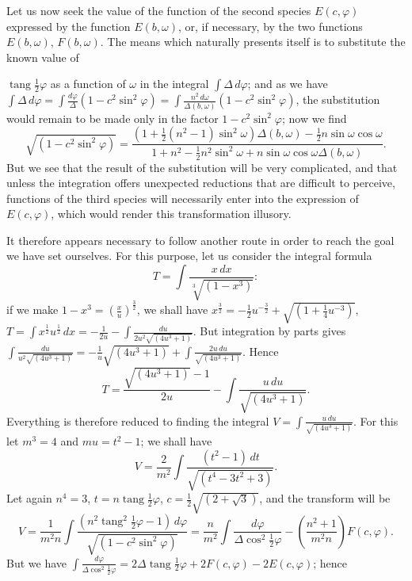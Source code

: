 \documentclass{article}
\begin{document}
Let us now seek the value of the function of the second species $E(c,\varphi)$ expressed by the function $E(b,\omega)$, or, if necessary, by the two functions $E(b,\omega)$, $F(b,\omega)$. The means which naturally presents itself is to substitute the known value of

$\operatorname{tang}\frac{1}{2}\varphi$ as a function of $\omega$ in the integral $\displaystyle\int\Delta\,d\varphi$; and as we have $\displaystyle\int\Delta\,d\varphi=\displaystyle\int\frac{d\varphi}{\Delta}(1-c^{2}\sin^{2}\varphi)=\displaystyle\int\frac{n^{2}\,d\omega}{\Delta(b,\omega)}(1-c^{2}\sin^{2}\varphi)$, the substitution would remain to be made only in the factor $1-c^{2}\sin^{2}\varphi$; now we find
\[ \sqrt{(1-c^{2}\sin^{2}\varphi)}=\frac{(1+\tfrac{1}{2}(n^{2}-1)\sin^{2}\omega)\Delta(b,\omega)-\tfrac{1}{2}n\sin\omega\cos\omega}{1+n^{2}-\tfrac{1}{2}n^{2}\sin^{2}\omega+n\sin\omega\cos\omega\Delta(b,\omega)}. \]
But we see that the result of the substitution will be very complicated, and that unless the integration offers unexpected reductions that are difficult to perceive, functions of the third species will necessarily enter into the expression of $E(c,\varphi)$, which would render this transformation illusory.

It therefore appears necessary to follow another route in order to reach the goal we have set ourselves. For this purpose, let us consider the integral formula
\[ T=\int\frac{x\,dx}{\sqrt[3]{(1-x^{3})}}: \]
if we make $1-x^{3}=\left(\frac{x}{u}\right)^{\frac{3}{2}}$, we shall have $x^{\frac{3}{2}}=-\frac{1}{2}u^{-\frac{3}{2}}+\sqrt{(1+\frac{1}{4}u^{-3})}$, $T=\displaystyle\int x^{\frac{1}{2}}u^{\frac{1}{2}}\,dx=-\frac{1}{2u}-\displaystyle\int\frac{du}{2u^{2}\sqrt{(4u^{3}+1)}}$. But integration by parts gives $\displaystyle\int\frac{du}{u^{2}\sqrt{(4u^{3}+1)}}=-\frac{1}{u}\sqrt{(4u^{3}+1)}+\displaystyle\int\frac{2u\,du}{\sqrt{(4u^{3}+1)}}$. Hence
\[ T=\frac{\sqrt{(4u^{3}+1)}-1}{2u}-\int\frac{u\,du}{\sqrt{(4u^{3}+1)}}. \]
Everything is therefore reduced to finding the integral $V=\displaystyle\int\frac{u\,du}{\sqrt{(4u^{3}+1)}}$. For this let $m^{3}=4$ and $mu=t^{2}-1$; we shall have
\[ V=\frac{2}{m^{2}}\int\frac{(t^{2}-1)\,dt}{\sqrt{(t^{4}-3t^{2}+3)}}. \]
Let again $n^{4}=3$, $t=n\operatorname{tang}\frac{1}{2}\varphi$, $c=\frac{1}{2}\sqrt{(2+\sqrt{3})}$, and the transform will be
\[ V=\frac{1}{m^{2}n}\int\frac{(n^{2}\operatorname{tang}^{2}\tfrac{1}{2}\varphi-1)\,d\varphi}{\sqrt{(1-c^{2}\sin^{2}\varphi)}}=\frac{n}{m^{2}}\int\frac{d\varphi}{\Delta\cos^{2}\tfrac{1}{2}\varphi}-\left(\frac{n^{2}+1}{m^{2}n}\right)F(c,\varphi). \]
But we have $\displaystyle\int\frac{d\varphi}{\Delta\cos^{2}\frac{1}{2}\varphi}=2\Delta\operatorname{tang}\frac{1}{2}\varphi+2F(c,\varphi)-2E(c,\varphi)$; hence
\end{document}
